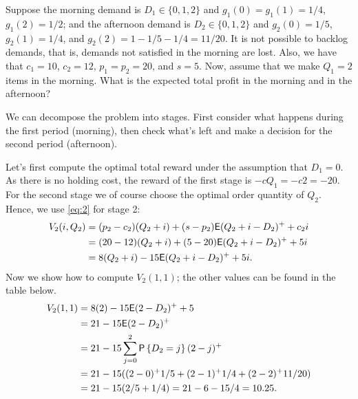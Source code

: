 \begin{question}
Suppose the morning demand is $D_1\in \{0,1,2\}$ and $g_1(0)=g_1(1)=1/4$, $g_1(2)=1/2$; and the afternoon demand is $D_2\in \{0,1, 2\}$ and $g_2(0)=1/5$, $g_2(1)=1/4$, and $g_2(2)=1-1/5 - 1/4=11/20$. It is not possible to backlog demands, that is,  demands not satisfied in the morning are lost. Also, we have that $c_1=10$, $c_2=12$, $p_1=p_2=20$, and $s=5$. Now, assume that we make $Q_1=2$ items in the morning. What is the expected total profit in the morning and in the afternoon?  
\begin{solution}
We can decompose the problem into stages. First consider what happens during the first period (morning), then check what's left and make a decision for the second period (afternoon). 

Let's first compute the optimal total reward under the assumption that
$D_1=0$. As there is no holding cost, the reward of the first stage is $-cQ_1 = -c 2 = -20$. For the second stage we of course choose the optimal order quantity of $Q_2$. Hence, we use \eqref{eq:2} for stage 2:
\begin{equation*}
  \begin{split}
V_2(i, Q_2) 
&= (p_2-c_2)(Q_2+i) + (s-p_2)\mathsf{E} (Q_2+i-D_2)^+ + c_2i \\
&= (20-12)(Q_2+i) + (5-20)\mathsf{E} (Q_2+i-D_2)^+ + 5i \\
&= 8(Q_2+i) -15 \mathsf{E} (Q_2+i-D_2)^+ + 5i.
  \end{split}
\end{equation*}
Now we show how to compute $V_2(1,1)$;  the other values can be found in the table below.
\begin{equation*}
  \begin{split}
V_2(1,1) 
&= 8(2) -15 \ex (2-D_2)^+ + 5\\
&= 21  -15 \ex (2-D_2)^+ \\
&= 21  - 15 \sum_{j=0}^2 \P{D_2 = j} (2-j)^+ \\
&= 21  - 15 ((2-0)^+ 1/5 + (2-1)^+ 1/4+ (2-2)^+11/20) \\
&= 21  - 15 (2/5 + 1/4) = 21 - 6 - 15/4 = 10.25.
  \end{split}
\end{equation*}




\end{solution}
\end{question}

